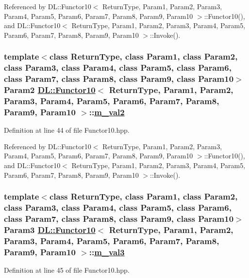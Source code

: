 Referenced by DL::Functor10$<$ Return\-Type, Param1, Param2, Param3, Param4, Param5, Param6, Param7, Param8, Param9, Param10 $>$::Functor10(), and DL::Functor10$<$ Return\-Type, Param1, Param2, Param3, Param4, Param5, Param6, Param7, Param8, Param9, Param10 $>$::Invoke().\hypertarget{classDL_1_1Functor10_r2}{
\subsubsection[m\_\-val2]{\setlength{\rightskip}{0pt plus 5cm}template$<$class Return\-Type, class Param1, class Param2, class Param3, class Param4, class Param5, class Param6, class Param7, class Param8, class Param9, class Param10$>$ Param2 \hyperlink{classDL_1_1Functor10}{DL::Functor10}$<$ Return\-Type, Param1, Param2, Param3, Param4, Param5, Param6, Param7, Param8, Param9, Param10 $>$::\hyperlink{classDL_1_1Functor10_r2}{m\_\-val2}}}
\label{classDL_1_1Functor10_r2}




Definition at line 44 of file Functor10.hpp.

Referenced by DL::Functor10$<$ Return\-Type, Param1, Param2, Param3, Param4, Param5, Param6, Param7, Param8, Param9, Param10 $>$::Functor10(), and DL::Functor10$<$ Return\-Type, Param1, Param2, Param3, Param4, Param5, Param6, Param7, Param8, Param9, Param10 $>$::Invoke().\hypertarget{classDL_1_1Functor10_r3}{
\subsubsection[m\_\-val3]{\setlength{\rightskip}{0pt plus 5cm}template$<$class Return\-Type, class Param1, class Param2, class Param3, class Param4, class Param5, class Param6, class Param7, class Param8, class Param9, class Param10$>$ Param3 \hyperlink{classDL_1_1Functor10}{DL::Functor10}$<$ Return\-Type, Param1, Param2, Param3, Param4, Param5, Param6, Param7, Param8, Param9, Param10 $>$::\hyperlink{classDL_1_1Functor10_r3}{m\_\-val3}}}
\label{classDL_1_1Functor10_r3}




Definition at line 45 of file Functor10.hpp.

